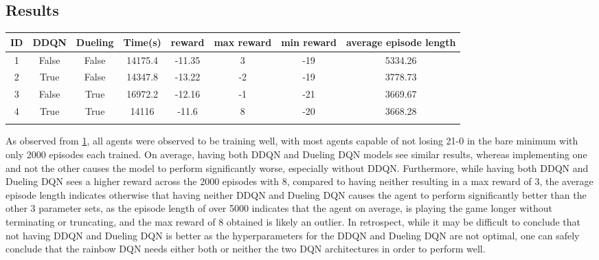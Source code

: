 \subsection{Results}
\begin{table}[h]
	\centering
	\scriptsize
	\begin{tabular}{c c c | c c c c c}
		\toprule
		ID & DDQN & Dueling & Time(s) & reward & max reward & min reward & average episode length \\
  \midrule
		\colorbox{id1}{1} & False & False & 14175.4 & -11.35 & 3 & -19 & 5334.26 \\
		\colorbox{id2}{2} & True & False & 14347.8 & -13.22 & -2 & -19 & 3778.73 \\
		\colorbox{id3}{3} & False & True & 16972.2 & -12.16 & -1 & -21 & 3669.67 \\
		\colorbox{id4}{4} & True & True & 14116 & -11.6 & 8 & -20 & 3668.28 \\
  \bottomrule
  \label{Gridsearch Results}
  \end{tabular}
  \end{table}

  As observed from \cref{Gridsearch Results}, all agents were observed to be training well, with most agents capable of not losing 21-0 in the bare minimum with only 2000 episodes each trained. On average, having both DDQN and Dueling DQN models see similar results, whereas implementing one and not the other causes the model to perform significantly worse, especially without DDQN.
  Furthermore, while having both DDQN and Dueling DQN sees a higher reward across the 2000 episodes with 8, compared to having neither resulting in a max reward of 3, the average episode length indicates otherwise that having neither DDQN and Dueling DQN causes the agent to perform significantly better than the other 3 parameter sets, as the episode length of over 5000 indicates that the agent on average, is playing the game longer without terminating or truncating, and the max reward of 8 obtained is likely an outlier.
  In retrospect, while it may be difficult to conclude that not having DDQN and Dueling DQN is better as the hyperparameters for the DDQN and Dueling DQN are not optimal, one can safely conclude that the rainbow DQN needs either both or neither the two DQN architectures in order to perform well.